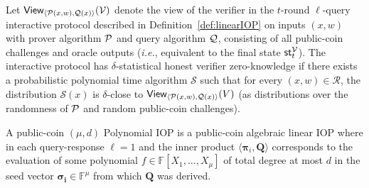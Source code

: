 \begin{definition}
Let $\textsf{View}_{\langle \mathcal{P}(x, w), \mathcal{Q}(x) \rangle}(\mathcal{V})$ denote the view of the verifier in the $t$-round $\ell$-query interactive protocol described in Definition~\ref{def:linearIOP} on inputs $(x,w)$ with prover algorithm $\mathcal{P}$ and query algorithm $\mathcal{Q}$, consisting of all public-coin challenges and oracle outputs (\emph{i.e.}, equivalent to the final state $\textsf{st}^\mathcal{V}_t$). The interactive protocol has $\delta$-statistical honest verifier zero-knowledge if there exists a probabilistic polynomial time algorithm $\mathcal{S}$ such that for every $(x, w) \in \mathcal{R}$, the distribution $\mathcal{S}(x)$ is $\delta$-close to $\textsf{View}_{\langle \mathcal{P}(x, w), \mathcal{Q}(x) \rangle}(V)$ (as distributions over the randomness of $\mathcal{P}$ and random public-coin challenges).
\end{definition}

\begin{definition} 
A public-coin $(\mu, d)$ Polynomial IOP is a public-coin algebraic linear IOP where in each query-response $\ell = 1$ and the inner product $\langle \boldsymbol{\pi}_i , \mathbf{Q} \rangle$ corresponds to the evaluation of some polynomial $f \in \mathbb{F}[X_1, \ldots, X_\mu]$ of total degree at most $d$ in the seed vector $\boldsymbol{\sigma_i} \in \mathbb{F}^\mu$ from which $\mathbf{Q}$ was derived.
\end{definition}



